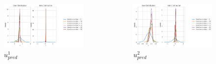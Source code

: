 \documentclass{beamer}
\begin{document}
\begin{frame}
    \begin{columns}[c]
    
        \begin{figure}
            \centering
            \includegraphics[width=1\textwidth]{images/new_photo/u_1_distr.png}
            \vspace*{-9mm}\caption{$u_{pred}^1$}
        \end{figure}

        \begin{figure}
            \centering
            \includegraphics[width=1\textwidth]{images/new_photo/u_2_distr.png}
            \vspace*{-9mm}\caption{$u_{pred}^2$}
        \end{figure}

     \vspace*{-12mm}\end{columns}
        \begin{columns}[c]


\end{columns}
\end{frame}
\end{document}
